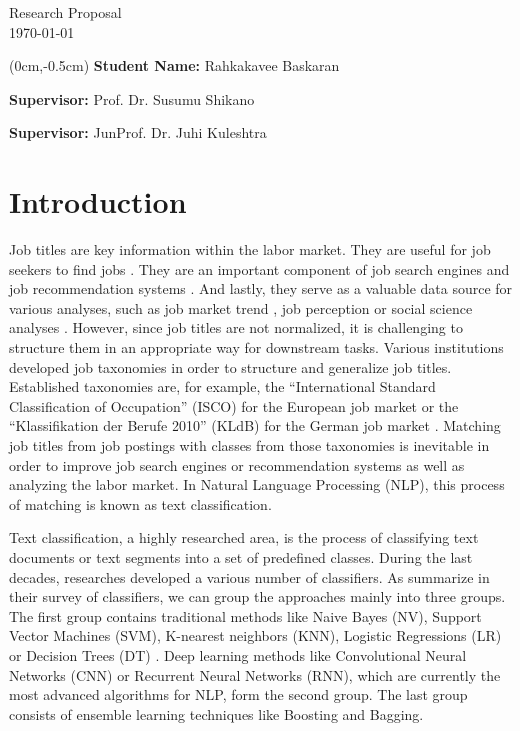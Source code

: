\documentclass[a4paper]{article}
\begin{document}
\begin{center}  	
\Large{Research Proposal}\\
\today
\vspace{1cm}
\end{center}


\begin{textblock*}{\textwidth}(0cm,-0.5cm)
    \textbf{Student Name:} Rahkakavee Baskaran

    \textbf{Supervisor:} Prof. Dr. Susumu Shikano

    \textbf{Supervisor:} JunProf. Dr. Juhi Kuleshtra

\end{textblock*}

\medskip

\medskip

\section{Introduction}
Job titles are key information within the labor market. They are useful for job seekers to find jobs \citep{Marinescu2020}. They are an important component of job search engines \citep{Slamet018, Javed2015, Javed2016} and job recommendation systems \citep{Malherbe2014}. And lastly, they serve as a valuable data source for various analyses, such as job market trend \citep{Martin2021, Li2021}, job perception \citep{Smith1989, Bodyston2019} or social science analyses \citep{Martin2021}. However, since job titles are not normalized, it is challenging to structure them in an appropriate way for downstream tasks. Various institutions developed job taxonomies in order to structure and generalize job titles. Established taxonomies are, for example, the ``International Standard Classification of Occupation'' (ISCO) for the European job market or the ``Klassifikation der Berufe 2010'' (KLdB) for the German job market \citep{Uter2020}. Matching job titles from job postings with classes from those taxonomies is inevitable in order to improve job search engines or recommendation systems as well as analyzing the labor market. In Natural Language Processing (NLP), this process of matching is known as text classification. 

Text classification, a highly researched area, is the process of classifying text documents or text segments into a set of predefined classes. During the last decades, researches developed a various number of classifiers. As \cite{Kowsari2019} summarize in their survey of classifiers, we can group the approaches mainly into three groups. The first group contains traditional methods like Naive Bayes (NV), Support Vector Machines (SVM), K-nearest neighbors (KNN),  Logistic Regressions (LR) or Decision Trees (DT) \citep{Vijayan2017, Colas2006, Kowsari2019, Sebastiani2001}. Deep learning methods like Convolutional Neural Networks (CNN) or Recurrent Neural Networks (RNN), which are currently the most advanced algorithms for NLP, form the second group. The last group consists of ensemble learning techniques like Boosting and Bagging.
\end{document}
